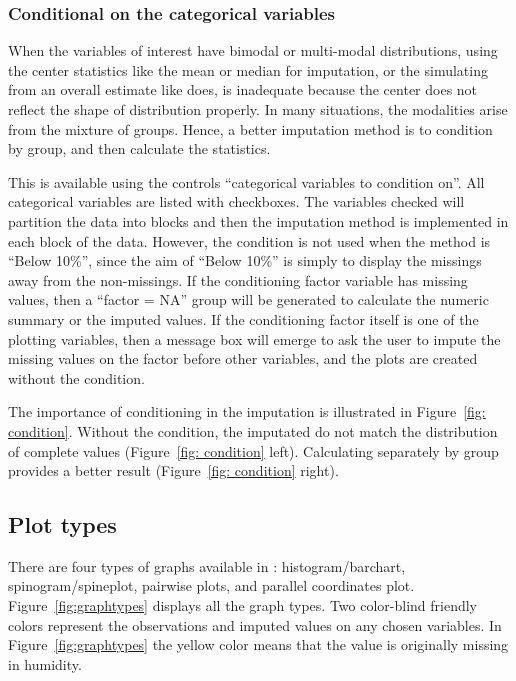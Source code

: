 \documentclass[article]{jss}
\begin{document}
\subsubsection{Conditional on the categorical variables}

When the variables of interest have bimodal or multi-modal distributions, using the center statistics like the mean or median for imputation, or the simulating from an overall estimate like  does, is inadequate because the center does not reflect the shape of distribution properly. In many situations, the modalities arise from the mixture of groups. Hence, a better imputation method is to condition by group, and then calculate the statistics.

This is available using the controls ``categorical variables to condition on''. All categorical variables are listed with checkboxes. The variables checked will partition the data into blocks and then the imputation method is implemented in each block of the data. However, the condition is not used when the method is ``Below 10\%'', since the aim of ``Below 10\%'' is simply to display the missings away from the non-missings. If the conditioning factor variable has missing values, then a ``factor = NA'' group will be generated to calculate the numeric summary or the imputed values. If the conditioning factor itself is one of the plotting variables, then a message box will emerge to ask the user to impute the missing values on the factor before other variables, and the plots are created without the condition.

The importance of conditioning in the imputation is illustrated in Figure~\ref{fig: condition}. Without the condition, the imputated do not match the distribution of complete values (Figure~\ref{fig: condition} left). Calculating separately by group provides a better result (Figure~\ref{fig: condition} right).


\subsection{Plot types}\label{plottype}

There are four types of graphs available in : histogram/barchart, spinogram/spineplot, pairwise plots, and parallel coordinates plot. Figure~\ref{fig:graphtypes} displays all the graph types. Two color-blind friendly colors represent the observations and imputed values on any chosen variables. In Figure~\ref{fig:graphtypes} the yellow color means that the value is originally missing in humidity.
\end{document}
